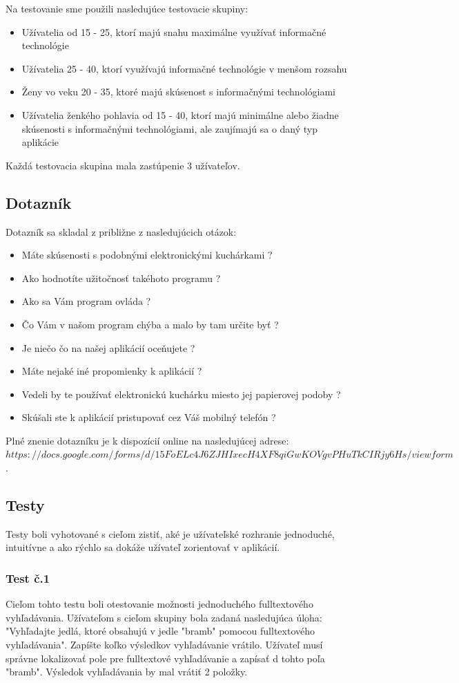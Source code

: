 \documentclass[12pt,a4paper,titlepage,final]{article}
\begin{document}
Na testovanie sme použili nasledujúce testovacie skupiny:
\begin{itemize}
\item Užívatelia od 15 - 25, ktorí majú snahu maximálne využívať informačné technológie
\item Užívatelia 25 - 40, ktorí využívajú informačné technológie v menšom rozsahu
\item Ženy vo veku 20 - 35, ktoré majú skúsenost s informačnými technológiami
\item Užívatelia ženkého pohlavia od 15 - 40, ktorí majú minimálne alebo žiadne skúsenosti s informačnými technológiami, ale zaujímajú sa o daný typ aplikácie
\end{itemize}
Každá testovacia skupina mala zastúpenie 3 užívateľov.

\subsection{Dotazník}
Dotazník sa skladal z približne z nasledujúcich otázok:
\begin{itemize}
\item Máte skúsenosti s podobnými elektronickými kuchárkami ?
\item Ako hodnotíte užitočnosť takéhoto programu ?
\item Ako sa Vám program ovláda ?
\item Čo Vám v našom program chýba a malo by tam určite byť ?
\item Je niečo čo na našej aplikácií oceňujete ?
\item Máte nejaké iné propomienky k aplikácií ?
\item Vedeli by te používať elektronickú kuchárku miesto jej papierovej podoby ?
\item Skúšali ste k aplikácií pristupovať cez Váš mobilný telefón ?


\end{itemize}
Plné znenie dotazníku je k dispozícií online na nasledujúcej adrese:$https://docs.google.com/forms/d/15FoELc4J6ZJHIxecH4XF8qiGwKOVgvPHuTkCIRjy6Hs/viewform$. 

\subsection{Testy}
Testy boli vyhotované s cieľom zistiť, aké je užívateľské rozhranie jednoduché, intuitívne a ako rýchlo sa dokáže užívateľ zorientovať v aplikácií. 

\subsubsection{Test č.1}
Cieľom tohto testu boli otestovanie možnosti jednoduchého fulltextového vyhľadávania. Užívateľom s cieľom skupiny bola zadaná nasledujúca úloha: "Vyhľadajte jedlá, ktoré obsahujú v jedle "bramb" pomocou fulltextového vyhľadávania". Zapíšte koľko výsledkov vyhľadávanie vrátilo. Užívateľ musí správne lokalizovať pole pre fulltextové vyhľadávanie a zapísať d tohto poľa "bramb". Výsledok vyhľadávania by mal vrátiť 2 položky.
\end{document}
